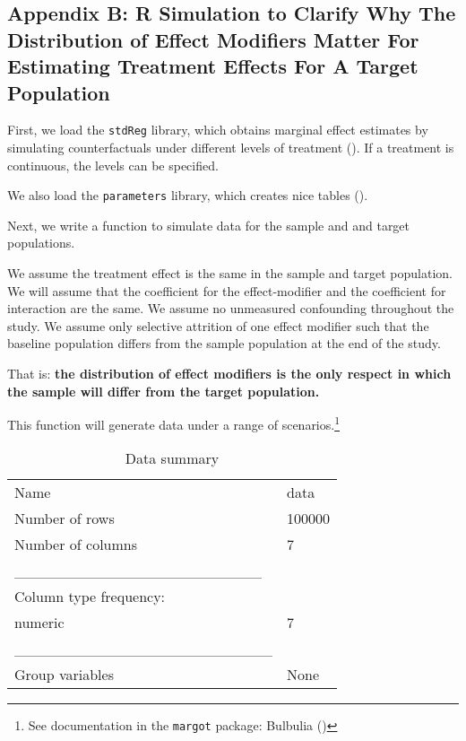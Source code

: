 \documentclass[
  single column]{article}
\begin{document}
\subsection{Appendix B: R Simulation to Clarify Why The Distribution of
Effect Modifiers Matter For Estimating Treatment Effects For A Target
Population}\label{appendix-b-r-simulation-to-clarify-why-the-distribution-of-effect-modifiers-matter-for-estimating-treatment-effects-for-a-target-population}

First, we load the \texttt{stdReg} library, which obtains marginal
effect estimates by simulating counterfactuals under different levels of
treatment (). If a
treatment is continuous, the levels can be specified.

We also load the \texttt{parameters} library, which creates nice tables
().

Next, we write a function to simulate data for the sample and and target
populations.

We assume the treatment effect is the same in the sample and target
population. We will assume that the coefficient for the effect-modifier
and the coefficient for interaction are the same. We assume no
unmeasured confounding throughout the study. We assume only selective
attrition of one effect modifier such that the baseline population
differs from the sample population at the end of the study.

That is: \textbf{the distribution of effect modifiers is the only
respect in which the sample will differ from the target population.}

This function will generate data under a range of scenarios.\footnote{See
  documentation in the \texttt{margot} package: Bulbulia
  ()}

\begin{longtable}[]{@{}ll@{}}
\caption{Data summary}\tabularnewline
\toprule\noalign{}
\endfirsthead
\endhead
\bottomrule\noalign{}
\endlastfoot
Name & data \\
Number of rows & 100000 \\
Number of columns & 7 \\
\_\_\_\_\_\_\_\_\_\_\_\_\_\_\_\_\_\_\_\_\_\_\_ & \\
Column type frequency: & \\
numeric & 7 \\
\_\_\_\_\_\_\_\_\_\_\_\_\_\_\_\_\_\_\_\_\_\_\_\_ & \\
Group variables & None \\
\end{longtable}
\end{document}

